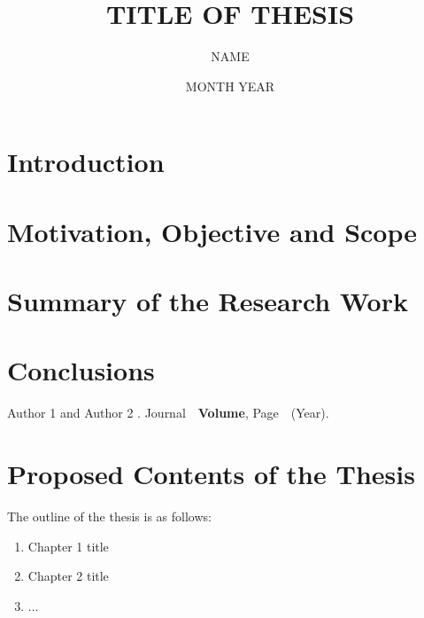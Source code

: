 \documentclass[PhD,synopsis]{iitmdiss}
\title{TITLE OF THESIS}
\author{NAME}
\date{MONTH YEAR}
\begin{document}
\maketitle



\setcounter{page}{0}
\section{Introduction}

\section{Motivation, Objective and Scope}

\section{Summary of the Research Work}

\section{Conclusions}



\begin{singlespace}
\begin{thebibliography}{10}

Author 1 and Author 2
.
\newblock Journal\ \ {\bf Volume}, Page\ \ (Year).
\end{thebibliography}

\end{singlespace}




\section{Proposed Contents of the Thesis}
The outline of the thesis is as follows:
\begin{enumerate}
\item Chapter 1 title
\item Chapter 2 title
\item ...
\end{enumerate}
\end{document}
